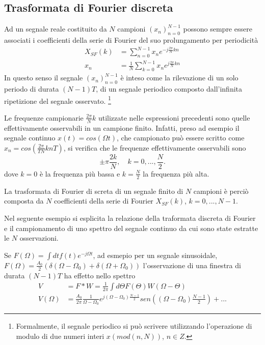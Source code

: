\subsection{Trasformata di Fourier discreta}
\label{sez:TDF}

Ad un segnale reale costituito da $N$ campioni $(x_{n})_{n=0}^{N-1}$ 
possono sempre essere associati i coefficienti della serie di Fourier del suo prolungamento per periodicità 
\begin{align}
 X_{SF}(k) & = \sum_{n=0}^{N-1} x_{n} e^{-j\frac{2\pi}{N}kn}  \\
 x_{n} &= \frac{1}{N} \sum_{k=0}^{N-1} x_{n} e^{j\frac{2\pi}{N}kn}
\end{align}
In questo senso il segnale $(x_{n})_{n=0}^{N-1}$ è inteso come la rilevazione di un solo periodo di durata $(N-1)T$, di un segnale periodico composto dall'infinita ripetizione del segnale osservato.
\footnote{Formalmente, il segnale periodico si può scrivere utilizzando l'operazione di modulo di due numeri interi
$x({mod}(n,N))$, $n\in Z$.}

Le frequenze campionarie $\frac{2\pi}{N}k$ utilizzate nelle espressioni precedenti sono quelle effettivamente osservabili in un campione finito. Infatti, preso ad esempio il segnale continuo
$x(t) = cos(\Omega t)$,
che campionato può essere scritto come
$x_{n} = cos( \frac{2\pi}{TN} k nT )$,
si verifica che le frequenze effettivamente osservabili sono
\begin{equation}
 \pm \pi \frac{2k}{N}, \quad k=0,...,\frac{N}{2}. 
\end{equation}
dove $k=0$ è la frequenza più bassa e $k=\frac{N}{2}$ la frequenza più alta.

La trasformata di Fourier di screta di un segnale finito di $N$ campioni è perciò composta da $N$ coefficienti della serie di Fourier $X_{SF}(k)$, $k = 0,... , N-1$.

Nel seguente esempio si esplicita la relazione della traformata discreta di Fourier e il campionamento di uno spettro del segnale continuo da cui sono state estratte le $N$ osservazioni.

Se $F(\Omega) = \int dt f(t)e^{-j\Omega t}$, ad esmepio per un segnale sinusoidale,
$F(\Omega) = \frac{A_{0}}{2}(\delta(\Omega-\Omega_{0}) + \delta(\Omega+\Omega_{0}))$
l'osservazione di una finestra di durata $(N-1)T$ ha effetto nello spettro
\begin{align}
V & = F*W = \frac{1}{2\pi} \int d\Theta F(\Theta) W(\Omega - \Theta)    \\
V(\Omega ) & = \frac{A_{0}}{2\pi}\frac{1}{\Omega - \Omega_{0}}
e^{j(\Omega-\Omega_{0})\frac{N-1}{2}} sen( (\Omega-\Omega_{0}) \frac{N-1}{2} ) + ...
\end{align}

